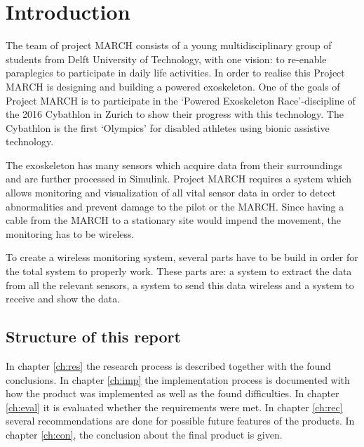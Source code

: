 \chapter{Introduction}
The team of project MARCH consists of a young multidisciplinary group of students from Delft University of Technology, with one vision: to re-enable paraplegics to participate in daily life activities. In order to realise this Project MARCH is designing and building a powered exoskeleton. One of the goals of Project MARCH is to participate in the ‘Powered Exoskeleton Race’-discipline of the 2016 Cybathlon in Zurich to show their progress with this technology. The Cybathlon is the first ‘Olympics’ for disabled athletes using bionic assistive technology.
 
The exoskeleton has many sensors which acquire data from their surroundings and are further processed in Simulink. Project MARCH requires a system which allows monitoring and visualization of all vital sensor data in order to detect abnormalities and prevent damage to the pilot or the MARCH. Since having a cable from the MARCH to a stationary site would impend the movement, the monitoring has to be wireless. 		

To create a wireless monitoring system, several parts have to be build in order for the total system to properly work. These parts are: a system to extract the data from all the relevant sensors, a system to send this data wireless and a system to receive and show the data.

\section{Structure of this report}
In chapter \ref{ch:res} the research process is described together with the found conclusions. In chapter \ref{ch:imp} the implementation process is documented with how the product was implemented as well as the found difficulties. In chapter \ref{ch:eval} it is evaluated whether the requirements were met. In chapter \ref{ch:rec} several recommendations are done for possible future features of the products.  In chapter \ref{ch:con}, the conclusion about the final product is given.
